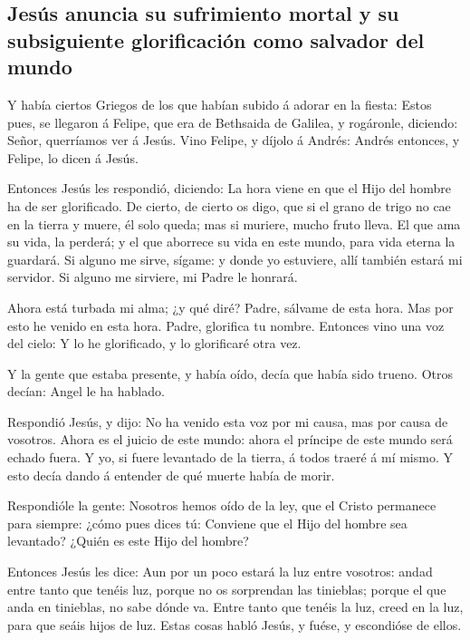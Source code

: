 \hypertarget{jesuxfas-anuncia-su-sufrimiento-mortal-y-su-subsiguiente-glorificaciuxf3n-como-salvador-del-mundo}{%
\subsection{Jesús anuncia su sufrimiento mortal y su subsiguiente
glorificación como salvador del
mundo}\label{jesuxfas-anuncia-su-sufrimiento-mortal-y-su-subsiguiente-glorificaciuxf3n-como-salvador-del-mundo}}

 Y había ciertos Griegos de los que habían subido á adorar
en la fiesta:  Estos pues, se llegaron á Felipe, que era de
Bethsaida de Galilea, y rogáronle, diciendo: Señor, querríamos ver á
Jesús.  Vino Felipe, y díjolo á Andrés: Andrés entonces, y
Felipe, lo dicen á Jesús.

 Entonces Jesús les respondió, diciendo: La hora viene en
que el Hijo del hombre ha de ser glorificado.  De cierto,
de cierto os digo, que si el grano de trigo no cae en la tierra y muere,
él solo queda; mas si muriere, mucho fruto lleva.  El que
ama su vida, la perderá; y el que aborrece su vida en este mundo, para
vida eterna la guardará.  Si alguno me sirve, sígame: y
donde yo estuviere, allí también estará mi servidor. Si alguno me
sirviere, mi Padre le honrará.

 Ahora está turbada mi alma; ¿y qué diré? Padre, sálvame de
esta hora. Mas por esto he venido en esta hora.  Padre,
glorifica tu nombre. Entonces vino una voz del cielo: Y lo he
glorificado, y lo glorificaré otra vez.

 Y la gente que estaba presente, y había oído, decía que
había sido trueno. Otros decían: Angel le ha hablado.

 Respondió Jesús, y dijo: No ha venido esta voz por mi
causa, mas por causa de vosotros.  Ahora es el juicio de
este mundo: ahora el príncipe de este mundo será echado fuera.
 Y yo, si fuere levantado de la tierra, á todos traeré á mí
mismo.  Y esto decía dando á entender de qué muerte había
de morir.

 Respondióle la gente: Nosotros hemos oído de la ley, que
el Cristo permanece para siempre: ¿cómo pues dices tú: Conviene que el
Hijo del hombre sea levantado? ¿Quién es este Hijo del hombre?

 Entonces Jesús les dice: Aun por un poco estará la luz
entre vosotros: andad entre tanto que tenéis luz, porque no os
sorprendan las tinieblas; porque el que anda en tinieblas, no sabe dónde
va.  Entre tanto que tenéis la luz, creed en la luz, para
que seáis hijos de luz. Estas cosas habló Jesús, y fuése, y escondióse
de ellos.


